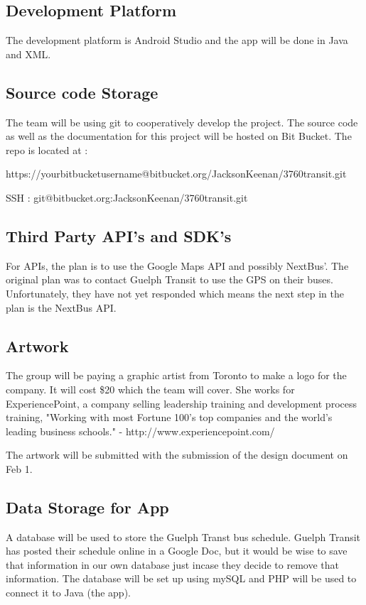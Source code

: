 \documentclass[a4paper,12pt]{article}
\begin{document}
\subsection{Development Platform}
The development platform is Android Studio and the app will be done in Java and XML.

\subsection{Source code Storage}
	The team will be using git to cooperatively develop the project. The source code as well
as the documentation for this project will be hosted on Bit 
Bucket.
The repo is located at :

https://yourbitbucketusername@bitbucket.org/JacksonKeenan/3760transit.git

SSH : git@bitbucket.org:JacksonKeenan/3760transit.git

\subsection{Third Party API's and SDK's}
	For APIs, the plan is to use the Google Maps API and possibly NextBus'. The original plan was to contact Guelph Transit to use the GPS on their buses.  Unfortunately, they have not yet responded which means the next step in the plan is the NextBus API.


\subsection{Artwork}
	The group will be paying a graphic artist from Toronto to make a logo for the company. It will cost \$20 which the team will cover. She works for ExperiencePoint, a company
 selling leadership training and development process training, 
 "Working with most Fortune 100's top companies and the world's leading business schools." 
 - http://www.experiencepoint.com/

The artwork will be submitted with the submission of the design document on Feb 1.

\subsection{Data Storage for App}
	A database will be used to store the Guelph Transt bus schedule.  Guelph Transit has 
posted their schedule online in a Google Doc, but it would be wise to save that 
information in our own database just incase they decide to remove that information. 
The database will be set up using mySQL and PHP will be used to connect it to Java (the app).
 
\end{document}
